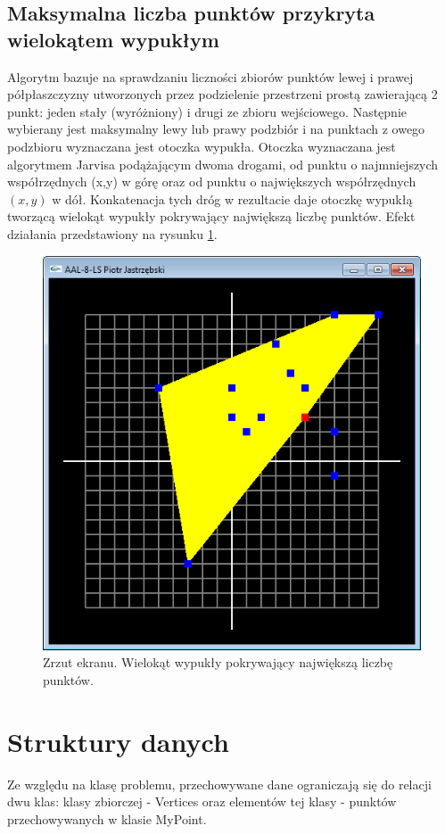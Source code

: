 \documentclass[11pt,a4paper]{article}
\begin{document}
\subsection{Maksymalna liczba punktów przykryta wielokątem wypukłym}
Algorytm bazuje na sprawdzaniu liczności zbiorów punktów lewej i prawej półpłaszczyzny utworzonych przez podzielenie przestrzeni prostą zawierającą 2 punkt: jeden stały (wyróżniony) i drugi ze zbioru wejściowego. Następnie wybierany jest maksymalny lewy lub prawy podzbiór i na punktach z owego podzbioru wyznaczana jest otoczka wypukła. Otoczka wyznaczana jest algorytmem Jarvisa podążającym dwoma drogami, od punktu o najmniejszych współrzędnych (x,y) w górę oraz od punktu o największych współrzędnych $(x,y)$ w dół. Konkatenacja tych dróg w rezultacie daje otoczkę wypukłą tworzącą wielokąt wypukły pokrywający największą liczbę punktów. Efekt działania przedstawiony na rysunku \ref{img_ss}.

\begin{figure}
\includegraphics[width=\textwidth]{ss.png}
\caption{Zrzut ekranu. Wielokąt wypukły pokrywający największą liczbę punktów.}
\label{img_ss} 
\end{figure}

\section{Struktury danych}
Ze względu na klasę problemu, przechowywane dane ograniczają się do relacji dwu klas: klasy zbiorczej - Vertices oraz elementów tej klasy - punktów przechowywanych w klasie MyPoint.
\end{document}
